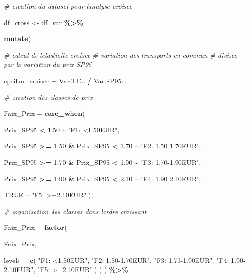 \documentclass[
]{article}
\newenvironment{Shaded}{\begin{snugshade}}{\end{snugshade}}
\newcommand{\AttributeTok}[1]{\textcolor[rgb]{0.13,0.29,0.53}{#1}}
\newcommand{\CommentTok}[1]{\textcolor[rgb]{0.56,0.35,0.01}{\textit{#1}}}
\newcommand{\ConstantTok}[1]{\textcolor[rgb]{0.56,0.35,0.01}{#1}}
\newcommand{\FloatTok}[1]{\textcolor[rgb]{0.00,0.00,0.81}{#1}}
\newcommand{\FunctionTok}[1]{\textcolor[rgb]{0.13,0.29,0.53}{\textbf{#1}}}
\newcommand{\NormalTok}[1]{#1}
\newcommand{\OtherTok}[1]{\textcolor[rgb]{0.56,0.35,0.01}{#1}}
\newcommand{\SpecialCharTok}[1]{\textcolor[rgb]{0.81,0.36,0.00}{\textbf{#1}}}
\newcommand{\StringTok}[1]{\textcolor[rgb]{0.31,0.60,0.02}{#1}}
\begin{document}
\begin{Shaded}
\begin{Highlighting}[]
\CommentTok{\# creation du dataset pour l\textquotesingle{}analyse croisee}

\NormalTok{df\_cross }\OtherTok{\textless{}{-}}\NormalTok{ df\_var }\SpecialCharTok{\%\textgreater{}\%}

  \FunctionTok{mutate}\NormalTok{(}

    \CommentTok{\# calcul de l\textquotesingle{}elasticite croisee}
    \CommentTok{\# variation des transports en commun}
    \CommentTok{\# divisee par la variation du prix SP95}

    \AttributeTok{epsilon\_croisee =}\NormalTok{ Var.TC.. }\SpecialCharTok{/}\NormalTok{ Var.SP95..,}

    \CommentTok{\# creation des classes de prix}

    \AttributeTok{Faix\_Prix =} \FunctionTok{case\_when}\NormalTok{(}

\NormalTok{      Prix\_SP95 }\SpecialCharTok{\textless{}} \FloatTok{1.50} \SpecialCharTok{\textasciitilde{}} \StringTok{"F1: \textless{}1.50EUR"}\NormalTok{,}

\NormalTok{      Prix\_SP95 }\SpecialCharTok{\textgreater{}=} \FloatTok{1.50} \SpecialCharTok{\&}\NormalTok{ Prix\_SP95 }\SpecialCharTok{\textless{}} \FloatTok{1.70} \SpecialCharTok{\textasciitilde{}} \StringTok{"F2: 1.50{-}1.70EUR"}\NormalTok{,}

\NormalTok{      Prix\_SP95 }\SpecialCharTok{\textgreater{}=} \FloatTok{1.70} \SpecialCharTok{\&}\NormalTok{ Prix\_SP95 }\SpecialCharTok{\textless{}} \FloatTok{1.90} \SpecialCharTok{\textasciitilde{}} \StringTok{"F3: 1.70{-}1.90EUR"}\NormalTok{,}

\NormalTok{      Prix\_SP95 }\SpecialCharTok{\textgreater{}=} \FloatTok{1.90} \SpecialCharTok{\&}\NormalTok{ Prix\_SP95 }\SpecialCharTok{\textless{}} \FloatTok{2.10} \SpecialCharTok{\textasciitilde{}} \StringTok{"F4: 1.90{-}2.10EUR"}\NormalTok{,}

      \ConstantTok{TRUE} \SpecialCharTok{\textasciitilde{}} \StringTok{"F5: \textgreater{}=2.10EUR"}
\NormalTok{    ),}

    \CommentTok{\# organisation des classes dans l\textquotesingle{}ordre croissant}

    \AttributeTok{Faix\_Prix =} \FunctionTok{factor}\NormalTok{(}

\NormalTok{      Faix\_Prix,}

      \AttributeTok{levels =} \FunctionTok{c}\NormalTok{(}
        \StringTok{"F1: \textless{}1.50EUR"}\NormalTok{,}
        \StringTok{"F2: 1.50{-}1.70EUR"}\NormalTok{,}
        \StringTok{"F3: 1.70{-}1.90EUR"}\NormalTok{,}
        \StringTok{"F4: 1.90{-}2.10EUR"}\NormalTok{,}
        \StringTok{"F5: \textgreater{}=2.10EUR"}
\NormalTok{      )}
\NormalTok{    )}
\NormalTok{  ) }\SpecialCharTok{\%\textgreater{}\%}


\end{Highlighting}
\end{Shaded}
\end{document}
